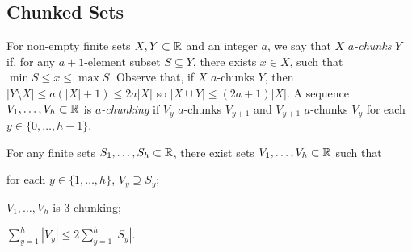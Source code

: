 \documentclass[10pt, conference, compsocconf]{IEEEtran}
\let\le\leqslant
\begin{document}

\subsection{Chunked Sets}

For non-empty finite sets $X,Y\subset \mathbb{R}$ and an integer $a$, we say that $X$ \emph{$a$-chunks} $Y$ if, for any $a+1$-element subset $S\subseteq Y$, there exists $x\in X$, such that $\min S\le x\le \max S$. Observe that, if $X$ $a$-chunks $Y$, then $|Y\setminus X|\le a(|X|+1)\le 2a|X|$ so $|X\cup Y|\le (2a+1)|X|$.  A sequence $V_1,\dots,V_h\subset\mathbb{R}$ is \emph{$a$-chunking} if $V_y$ $a$-chunks $V_{y+1}$ and $V_{y+1}$ $a$-chunks $V_y$ for each $y\in\{0,\dots,h-1\}$.

\begin{lem}
  For any finite sets $S_1,\dots,S_h\subset\mathbb{R}$, there exist sets $V_1,\dots,V_{h}\subset\mathbb{R}$ such that
  \begin{compactenum}
    \item for each $y\in\{1,\dots,h\}$, $V_y\supseteq S_y$;
    \item $V_1,\dots,V_h$ is $3$-chunking;
    \item $\sum_{y=1}^h |V_y|\le 2\sum_{y=1}^h |S_y|$.
  \end{compactenum}
\end{lem}
\end{document}
